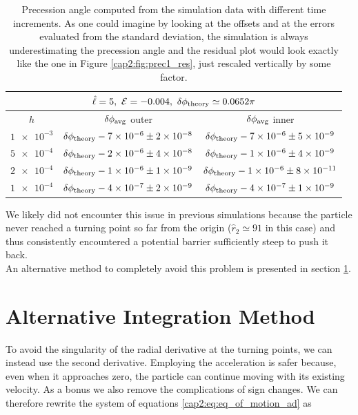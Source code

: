 \begin{table}[h]
    \centering
    \begin{tabular}{|c|c|c|}
        \hline
        \multicolumn{3}{|c|}{$\hat \ell = 5, ~ \mathcal E = -0.004,
        ~ \delta \phi_{\rm theory} \simeq 0.0652 \pi$} \\
        \hline
        $h$ & $\delta \phi_{\rm avg}$ outer & $\delta \phi_{\rm avg}$ inner \\
        \hline
        $\num{1e-3}$ & $\delta \phi_{\rm theory} - \num{7e-6} \pm \num{2e-8}$
        & $\delta \phi_{\rm theory} - \num{7e-6} \pm \num{5e-9}$ \\
        \hline
        $\num{5e-4}$ & $\delta \phi_{\rm theory} - \num{2e-6} \pm \num{4e-8}$
        & $\delta \phi_{\rm theory} - \num{1e-6} \pm \num{4e-9}$ \\
        \hline
        $\num{2e-4}$ & $\delta \phi_{\rm theory} - \num{1e-6} \pm \num{1e-9}$
        & $\delta \phi_{\rm theory} - \num{1e-6} \pm \num{8e-11}$ \\
        \hline
        $\num{1e-4}$ & $\delta \phi_{\rm theory} - \num{4e-7} \pm \num{2e-9}$
        & $\delta \phi_{\rm theory} - \num{4e-7} \pm \num{1e-9}$ \\
        \hline
    \end{tabular}
    \caption{Precession angle computed from the simulation data with different
    time increments.
    As one could imagine by looking at the offsets and at the errors evaluated
    from the standard deviation, the simulation is always underestimating the
    precession angle and the residual plot would look exactly like the one in
    Figure \ref{cap2:fig:prec1_res}, just rescaled vertically by some factor.}
    \label{cap2:tab:prec1}
\end{table}

We likely did not encounter this issue in previous simulations because the
particle never reached a turning point so far from the origin
($\hat r_2 \simeq 91$ in this case) and thus consistently encountered a
potential barrier sufficiently steep to push it back. \\
An alternative method to completely avoid this problem is presented in section
\ref{cap2:sec:alt_method}.


\section{Alternative Integration Method}
\label{cap2:sec:alt_method}

To avoid the singularity of the radial derivative at the turning points, we can
instead use the second derivative. Employing the acceleration is safer because,
even when it approaches zero, the particle can continue moving with its existing
velocity.
As a bonus we also remove the complications of sign changes.
We can therefore rewrite the system of equations \ref{cap2:eq:eq_of_motion_ad}
as

